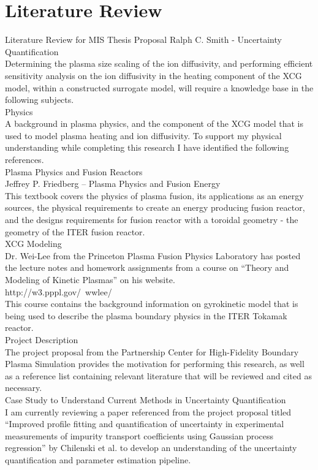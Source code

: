 \documentclass{article}
\begin{document}
\section{Literature Review}
Literature Review for MIS Thesis Proposal
Ralph C. Smith - Uncertainty Quantification\\
Determining the plasma size scaling of the ion diffusivity, and performing efficient sensitivity analysis on the ion diffusivity in the heating component of the XCG model, within a constructed surrogate model, will require a knowledge base in the following subjects.\\  
Physics\\
A background in plasma physics, and the component of the XCG model that is used to model plasma heating and ion diffusivity. To support my physical understanding while completing this research I have identified the following references.\\
Plasma Physics and Fusion Reactors\\
Jeffrey P. Friedberg – Plasma Physics and Fusion Energy\\
This textbook covers the physics of plasma fusion, its applications as an energy sources, the physical requirements to create an energy producing fusion reactor, and the designs requirements for fusion reactor with a toroidal geometry - the geometry of the ITER fusion reactor.\\
XCG Modeling\\
Dr. Wei-Lee from the Princeton Plasma Fusion Physics Laboratory has posted the lecture notes and homework assignments from a course on “Theory and Modeling of Kinetic Plasmas” on his website.\\
http://w3.pppl.gov/~wwlee/\\
 This course contains the background information on gyrokinetic model that is being used to describe the plasma boundary physics in the ITER Tokamak reactor. \\
Project Description\\
The project proposal from the Partnership Center for High-Fidelity Boundary Plasma Simulation provides the motivation for performing this research, as well as a reference list containing relevant literature that will be reviewed and cited as necessary. \\
Case Study to Understand Current Methods in Uncertainty Quantification\\
I am currently reviewing a paper referenced from the project proposal titled “Improved profile fitting and quantification of uncertainty in experimental measurements of impurity transport coefficients using Gaussian process regression” by Chilenski et al. to develop an understanding of the uncertainty quantification and parameter estimation pipeline.\\
\end{document}
